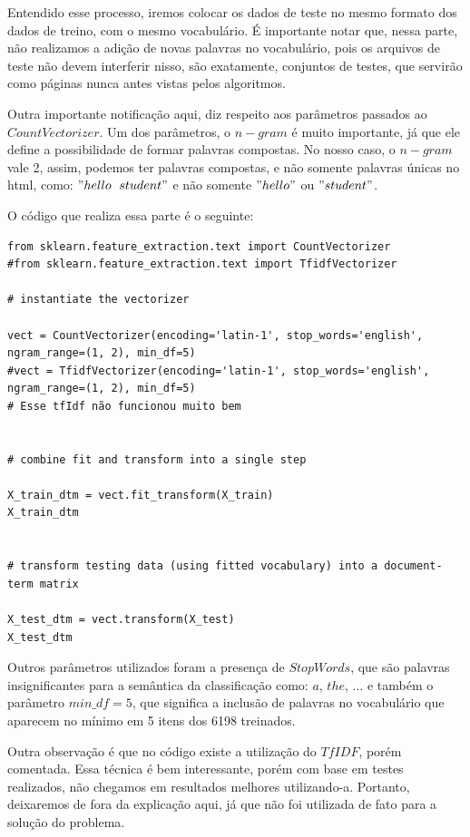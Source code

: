 \documentclass [12pt, a4paper] {article}
\begin{document}
Entendido esse processo, iremos colocar os dados de teste no mesmo formato dos dados de treino, com o mesmo vocabulário. É importante notar que, nessa parte, não realizamos a adição de novas palavras no vocabulário, pois os arquivos de teste não devem interferir nisso, são exatamente, conjuntos de testes, que servirão como páginas nunca antes vistas pelos algoritmos.

Outra importante notificação aqui, diz respeito aos parâmetros passados ao $CountVectorizer$. Um dos parâmetros, o $n-gram$ é muito importante, já que ele define a possibilidade de formar palavras compostas. No nosso caso, o $n-gram$ vale 2, assim, podemos ter palavras compostas, e não somente palavras únicas no html, como: $"hello \;\ student"$ e não somente $"hello"$ ou $"student"$. 

O código que realiza essa parte é o seguinte:

\begin{lstlisting}
from sklearn.feature_extraction.text import CountVectorizer
#from sklearn.feature_extraction.text import TfidfVectorizer

# instantiate the vectorizer

vect = CountVectorizer(encoding='latin-1', stop_words='english', ngram_range=(1, 2), min_df=5)
#vect = TfidfVectorizer(encoding='latin-1', stop_words='english', ngram_range=(1, 2), min_df=5)
# Esse tfIdf não funcionou muito bem

                       
# combine fit and transform into a single step

X_train_dtm = vect.fit_transform(X_train)
X_train_dtm


# transform testing data (using fitted vocabulary) into a document-term matrix

X_test_dtm = vect.transform(X_test)
X_test_dtm
\end{lstlisting}

Outros parâmetros utilizados foram a presença de $Stop Words$, que são palavras insignificantes para a semântica da classificação como: $a$, $the$, ...
e também o parâmetro $min\_df = 5$, que significa a inclusão de palavras no vocabulário que aparecem no mínimo em 5 itens dos 6198 treinados.

Outra observação é que no código existe a utilização do $TfIDF$, porém comentada. Essa técnica é bem interessante, porém com base em testes realizados, não chegamos em resultados melhores utilizando-a. Portanto, deixaremos de fora da explicação aqui, já que não foi utilizada de fato para a solução do problema.
\end{document}
